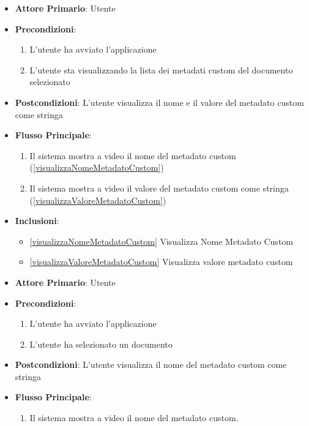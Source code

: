 \begin{itemize}
    \item \textbf{Attore Primario}: Utente
    \item \textbf{Precondizioni}:
    \begin{enumerate}
        \item L'utente ha avviato l'applicazione
        \item L'utente sta visualizzando la lista dei metadati custom del documento selezionato
    \end{enumerate}
    \item \textbf{Postcondizioni}: L'utente visualizza il nome e il valore del metadato custom come stringa
    \item \textbf{Flusso Principale}:
        \begin{enumerate}
            \item Il sistema mostra a video il nome del metadato custom (\ref{visualizzaNomeMetadatoCustom})
            \item Il sistema mostra a video il valore del metadato custom come stringa (\ref{visualizzaValoreMetadatoCustom})
        \end{enumerate}
    \item \textbf{Inclusioni}: \begin{itemize}
        \item \ref{visualizzaNomeMetadatoCustom} Visualizza Nome Metadato Custom
        \item \ref{visualizzaValoreMetadatoCustom} Visualizza valore metadato custom
    \end{itemize}
\end{itemize}

\begin{itemize}
      \item \textbf{Attore Primario}: Utente
      \item \textbf{Precondizioni}: \begin{enumerate}
      \item L'utente ha avviato l'applicazione
      \item L'utente ha selezionato un documento
      \end{enumerate}
      \item \textbf{Postcondizioni}: L'utente visualizza il nome del metadato custom come stringa
      \item \textbf{Flusso Principale}:
            \begin{enumerate}
                  \item Il sistema mostra a video il nome del metadato custom.
            \end{enumerate}
\end{itemize}

